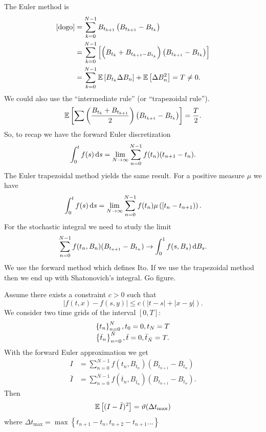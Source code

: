 \documentclass[12pt]{report}
\begin{document}
The \faBackward\; Euler method is
\begin{align*}
	\text{\ref{dogo}}&=\sum_{k=0}^{N-1}B_{t_{k+1}}\left(B_{t_{k+1}}-B_{t_{k}}\right)\\
	&=\sum_{k=0}^{N-1}\left[\left(B_{t_{k}}+B_{t_{k+1}-B_{t_{k}}}\right)\left(B_{t_{k+1}}-B_{t_{k}}\right)\right]\\
	&=\sum_{k=0}^{N-1}\mathbb{E}\left[B_{t_{k}}\Delta B_{n}\right]+\mathbb{E}\left[\Delta B^{2}_{n}\right]=T\neq0.
\end{align*} 
We could also use the ``intermediate rule'' (or ``trapezoidal rule'').
\begin{equation*}
	\mathbb{E}\left[\sum\left(\frac{B_{t_{k}}+B_{t_{k+1}}}{2}\right)\left(B_{t_{k+1}}-B_{t_{k}}\right)\right]=\frac{T}{2}.
\end{equation*}
So, to recap we have the forward Euler discretization
\begin{equation*}
	\int_{0}^{t}f(s)\mathop{}\!\mathrm{d} s=\lim_{N\to\infty}\sum_{n=0}^{N-1}f(t_{n})(t_{n+1}-t_{n}).
\end{equation*}
The Euler trapezoidal method yields the same result. For a positive measure $\mu$ we have
\begin{equation*}
	\int_{0}^{t}f(s)\mathop{}\!\mathrm{d} s=\lim_{N\to\infty}\sum_{n=0}^{N-1}f(t_{n})\mu\left([t_{n}-t_{n+1})\right).
\end{equation*}
For the stochastic integral we need to study the limit
\begin{equation*}
	\sum_{n=0}^{N-1}f(t_{n},B_{n})(B_{t_{n+1}}-B_{t_{n}})\to\int_{0}^{1}f(s,B_{s})\mathop{}\!\mathrm{d} B_{s}.
\end{equation*}
We use the forward method which defines Ito. If we use the trapezoidal method then we end up with Shatonovich's integral. Go figure.
\begin{theorem}
	Assume there exists a constraint $c>0$ such that
	\begin{equation*}
		|f(t,x)-f(s,y)|\leq c\left(|t-s|+|x-y|\right).
	\end{equation*}
	We consider two time grids of the interval $[0,T]$:
	\begin{equation*}
		\begin{array}{>{\displaystyle}l}
			\left\{t_{n}\right\}^{N}_{n=0}, t_{0}=0,t_{N}=T\\
			\left\{\bar{t}_{n}\right\}^{\bar{N}}_{n=0},\bar{t}=0,\bar{t}_{\bar{N}}=T.
		\end{array}
	\end{equation*}
	With the forward Euler approximation we get
	\begin{align*}
		I&=\sum_{n=0}^{N-1}f(t_{n},B_{t_{n}})(B_{t_{n+1}}-B_{t_{n}})\\
		\bar{I}&=\sum_{n=0}^{\bar{N}-1}f(\bar{t}_{n},B_{\bar{t}_{n}})(B_{t_{n+1}}-B_{t_{n}}).
	\end{align*}
	Then
	\begin{equation*}
		\mathbb{E}\left[(I-\bar{I})^{2}\right]=\vartheta(\Delta t_{
		\max})
	\end{equation*}
	where $\Delta t_{\max}=\max\left\{t_{n+1}-t_{n},t_{n+2}-t_{n+1}\ldots\right\}$ 
\end{theorem}
\end{document}
